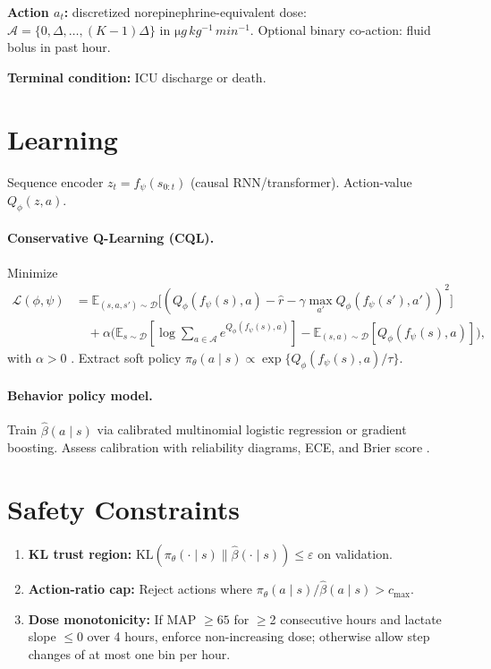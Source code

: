 \documentclass[11pt]{article}
\newcommand{\kl}{\mathrm{KL}}
\begin{document}
\textbf{Action $a_t$:} discretized norepinephrine-equivalent dose: $\mathcal A=\{0,\Delta,\ldots,(K-1)\Delta\}$ in $\si{\micro g\,kg^{-1}\,min^{-1}}$. Optional binary co-action: fluid bolus in past hour.

\textbf{Terminal condition:} ICU discharge or death.

\section{Learning}
Sequence encoder $z_t=f_\psi(s_{0:t})$ (causal RNN/transformer). Action-value $Q_\phi(z,a)$.

\paragraph{Conservative Q-Learning (CQL).} Minimize
\begin{align}
\mathcal L(\phi,\psi) &= \mathbb E_{(s,a,s')\sim\mathcal D}\Big[(Q_\phi(f_\psi(s),a)-\hat r-\gamma\max_{a'}Q_\phi(f_\psi(s'),a'))^2\Big]\\
&\quad+\alpha\Big(\mathbb E_{s\sim\mathcal D}[\log\sum_{a\in\mathcal A}e^{Q_\phi(f_\psi(s),a)}]-\mathbb E_{(s,a)\sim\mathcal D}[Q_\phi(f_\psi(s),a)]\Big),
\end{align}
with $\alpha>0$ \citep{kumar2020conservative}. Extract soft policy $\pi_\theta(a\mid s)\propto \exp\{Q_\phi(f_\psi(s),a)/\tau\}$.

\paragraph{Behavior policy model.} Train $\hat\beta(a\mid s)$ via calibrated multinomial logistic regression or gradient boosting. Assess calibration with reliability diagrams, ECE, and Brier score \citep{guo2017calibration,brier1950}.

\section{Safety Constraints}
\begin{enumerate}[leftmargin=*]
  \item \textbf{KL trust region:} $\kl(\pi_\theta(\cdot\mid s)\parallel \hat\beta(\cdot\mid s)) \leq \varepsilon$ on validation.
  \item \textbf{Action-ratio cap:} Reject actions where $\pi_\theta(a\mid s)/\hat\beta(a\mid s) > c_{\max}$.
  \item \textbf{Dose monotonicity:} If MAP $\geq 65$ for $\geq$2 consecutive hours and lactate slope $\leq 0$ over 4 hours, enforce non-increasing dose; otherwise allow step changes of at most one bin per hour.
\end{enumerate}
\end{document}
